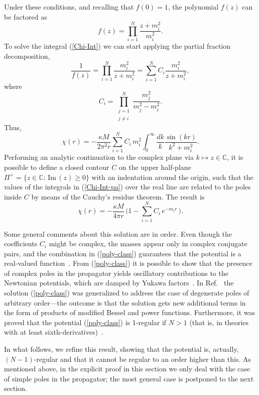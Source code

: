 \documentclass[aps,prd,a4paper,twocolumn,showpacs,showkeys,preprintnumbers,amsmath,amssymb,nofootinbib]{revtex4-2}
\numberwithin{equation}{section}
\def\beq{\begin{equation}}
\def\eeq{\end{equation}}
\renewcommand{\Im}{\,\mbox{Im}\,}
\newcommand{\eq}[1]{(\ref{#1})}
\newcommand{\n}[1]{\label{#1}}
\def\ka{\kappa}
\begin{document}
Under these conditions, and recalling that $f(0)=1$, the polynomial $f(z)$ can be factored as
\beq
\n{fz-poly}
f(z) = \prod_{i=1}^N \frac{z + m_i^2}{m_i^2} .
\eeq
To solve the integral \eq{Chi-Int} we can start applying the partial fraction decomposition,
\beq \label{PartFrac1}
\frac{1}{f(z)} = \prod_{i=1}^N \frac{m_i^2}{z + m_i^2}  = \sum_{i=1}^N C_i \frac{ m_i^2}{z + m_i^2}  ,
\eeq
where  
\beq
\n{coi}
C_i =  \prod_{\substack{j=1\\j \neq i}}^N \frac{m_j^2}{m_j^2 - m_i^2}  .
\eeq
Thus,
\beq \label{Chi-Int-pa}
\chi (r) = - \frac{\ka M}{ 2\pi^2 r}  \sum_{i=1}^N C_i \, m_i^2 \int_0^\infty \frac{dk}{k} 
\frac{  \sin (kr)}{k^2 + m_i^2} 
. 
\eeq
Performing an analytic continuation to the complex plane via $k \mapsto z \in \mathbb{C}$, it is possible to define a closed contour $C$ on the upper half-plane $\Pi^+=\lbrace z\in \mathbb{C}: \Im(z)\geqslant 0\rbrace$ with an indentation around the origin, such that the values of the integrals in \eq{Chi-Int-pa} over the real line are related to the poles inside $C$ by means of the Cauchy's residue theorem.  The result is~\cite{Newton-MNS,Newton-BLG}
\begin{equation}
\n{poly-class}
\chi (r) = - \frac{\ka M}{ 4 \pi r} \, \Bigg(  1
- \sum_{i=1}^N C_i \, e^{-m_i r}
\, \Bigg).
\end{equation}

Some general comments about this solution are in order. Even though the coefficients $C_i$ might be complex, the masses appear only in complex conjugate pairs, and the combination in \eq{poly-class} guarantees that the potential is a real-valued function~\cite{Newton-BLG}. From \eq{poly-class} it is possible to show that the presence of complex poles in the propagator yields oscillatory contributions to the Newtonian potentials, which are damped by Yukawa factors~\cite{Accioly:2016qeb}. In Ref.~\cite{BreTib1} the solution \eq{poly-class} was generalized to address the case of degenerate poles of arbitrary order---the outcome is that the solution gets new additional terms in the form of products of modified Bessel and power functions. 
Furthermore, it was proved that the potential \eq{poly-class} is 1-regular if $N>1$ (that is, in theories with at least sixth-derivatives)~\cite{BreTib1}. 

In what follows, we refine this result, showing that the potential is, actually, $(N-1)$-regular and that it cannot be regular to an order higher than this.
As mentioned above, in the explicit proof in this section we only deal with the case of simple poles in the propagator; the most general case is postponed to the next section.
\end{document}
